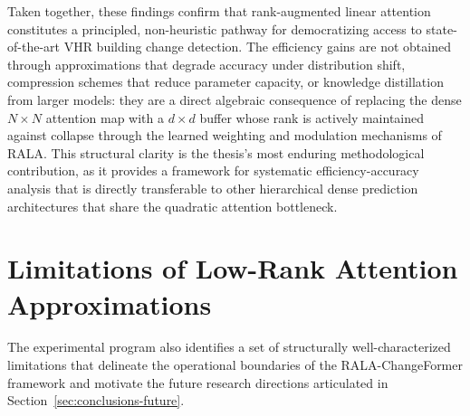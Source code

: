 Taken together, these findings confirm that rank-augmented linear attention
constitutes a principled, non-heuristic pathway for democratizing access to
state-of-the-art VHR building change detection. The efficiency gains are not
obtained through approximations that degrade accuracy under distribution shift,
compression schemes that reduce parameter capacity, or knowledge distillation
from larger models: they are a direct algebraic consequence of replacing the
dense $N \times N$ attention map with a $d \times d$ buffer whose rank is
actively maintained against collapse through the learned weighting and modulation
mechanisms of RALA. This structural clarity is the thesis's most enduring
methodological contribution, as it provides a framework for systematic
efficiency-accuracy analysis that is directly transferable to other hierarchical
dense prediction architectures that share the quadratic attention bottleneck.


\section{Limitations of Low-Rank Attention Approximations}
\label{sec:conclusions-limitations}

The experimental program also identifies a set of structurally well-characterized
limitations that delineate the operational boundaries of the RALA-ChangeFormer
framework and motivate the future research directions articulated in
Section~\ref{sec:conclusions-future}.

